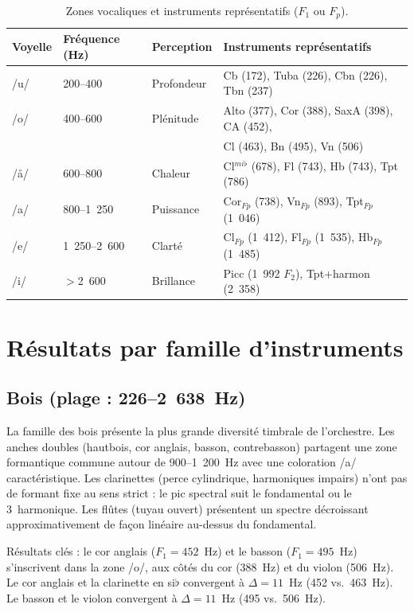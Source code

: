 \documentclass[12pt,a4paper]{article}
\begin{document}
\begin{table}[htbp]
\centering
\caption{Zones vocaliques et instruments représentatifs ($F_1$ ou $F_p$).}
\label{tab:vowels}
\begin{tabular}{llll}
\toprule
Voyelle & Fréquence (Hz) & Perception & Instruments représentatifs \\
\midrule
/u/ & 200--400 & Profondeur & Cb (172), Tuba (226), Cbn (226), Tbn (237) \\
/o/ & 400--600 & Plénitude  & Alto (377), Cor (388), SaxA (398), CA (452), \\
    &          &            & Cl (463), Bn (495), Vn (506) \\
/\aa/ & 600--800 & Chaleur  & Cl$^{mi\flat}$ (678), Fl (743), Hb (743), Tpt (786) \\
/a/ & 800--1~250 & Puissance & Cor$_{Fp}$ (738), Vn$_{Fp}$ (893), Tpt$_{Fp}$ (1~046) \\
/e/ & 1~250--2~600 & Clarté & Cl$_{Fp}$ (1~412), Fl$_{Fp}$ (1~535), Hb$_{Fp}$ (1~485) \\
/i/ & $>$2~600 & Brillance & Picc (1~992 $F_2$), Tpt+harmon (2~358) \\
\bottomrule
\end{tabular}
\end{table}

\section{Résultats par famille d'instruments}

\subsection{Bois (plage : 226--2~638~Hz)}

La famille des bois présente la plus grande diversité timbrale de l'orchestre. Les
anches doubles (hautbois, cor anglais, basson, contrebasson) partagent une zone
formantique commune autour de 900--1~200~Hz avec une coloration /a/ caractéristique.
Les clarinettes (perce cylindrique, harmoniques impairs) n'ont pas de formant fixe au
sens strict : le pic spectral suit le fondamental ou le 3\ieme~harmonique. Les flûtes
(tuyau ouvert) présentent un spectre décroissant approximativement de façon linéaire
au-dessus du fondamental.

Résultats clés : le cor anglais ($F_1 = 452$~Hz) et le basson ($F_1 = 495$~Hz)
s'inscrivent dans la zone /o/, aux côtés du cor (388~Hz) et du violon (506~Hz). Le
cor anglais et la clarinette en si$\flat$ convergent à $\Delta = 11$~Hz (452 vs.\
463~Hz). Le basson et le violon convergent à $\Delta = 11$~Hz (495 vs.\ 506~Hz).
\end{document}
